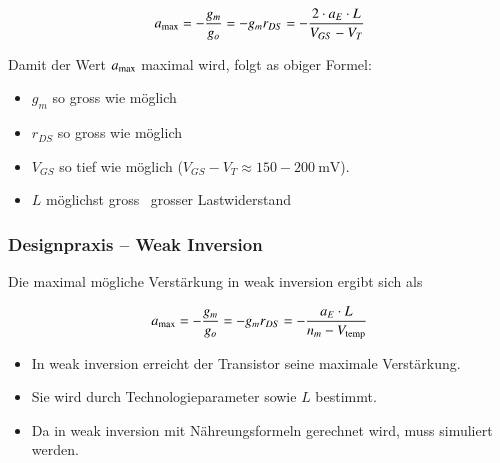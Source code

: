 \[
    a_{\rm max} = - \frac{g_m}{g_o} = -g_m r_{DS} = -\frac{2\cdot a_E \cdot L}{V_{GS} - V_T}
\]


Damit der Wert $a_{\rm max}$ maximal wird, folgt as obiger Formel:

\smallskip

\begin{minipage}[t]{0.35\columnwidth}
    \begin{itemize}
        \item $g_m$ so gross wie möglich
        \item $r_{DS}$ so gross wie möglich
    \end{itemize}
\end{minipage}
\hfill
\begin{minipage}[t]{0.62\columnwidth}
    \begin{itemize}
        \item $V_{GS}$ so tief wie möglich  ($V_{GS}-V_T \approx 150 - \qty{200}{\milli\volt}$).
        \item $L$ möglichst gross \textrightarrow\ grosser Lastwiderstand
    \end{itemize}
\end{minipage}



\subsubsection{Designpraxis -- Weak Inversion}

Die \textbf{} maximal mögliche Verstärkung in weak inversion ergibt sich als

\vspace{-0.2cm}

\[
    a_{\rm max} = - \frac{g_m}{g_o} = -g_m r_{DS} = -\frac{a_E \cdot L}{n_m - V_{\rm temp}}
\]


\begin{itemize}
    \item In weak inversion erreicht der Transistor seine maximale Verstärkung.
    \item Sie wird durch Technologieparameter sowie $L$ bestimmt.
    \item Da in weak inversion mit Nähreungsformeln gerechnet wird, muss simuliert werden.
\end{itemize}



